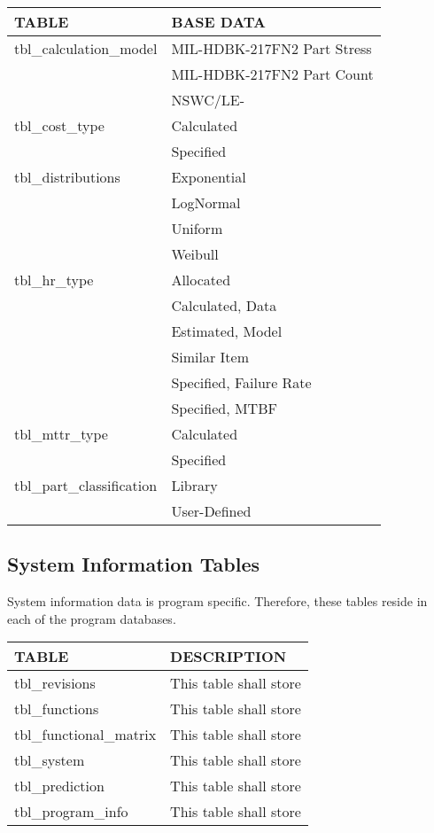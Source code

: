 \documentclass[11pt, 12pt, twoside, onecolumn]{article}
\begin{document}
    \begin{landscape}
    \begin{longtable}{ll}
    TABLE & BASE DATA \\
    \hline
    tbl\_calculation\_model & MIL-HDBK-217FN2 Part Stress \\
    & MIL-HDBK-217FN2 Part Count \\
    & NSWC/LE- \\
    tbl\_cost\_type & Calculated \\
    & Specified \\
    tbl\_distributions & Exponential \\
    & LogNormal \\
    & Uniform \\
    & Weibull \\
    tbl\_hr\_type & Allocated \\
    & Calculated, Data \\
    & Estimated, Model \\
    & Similar Item \\
    & Specified, Failure Rate \\
    & Specified, MTBF \\
    tbl\_mttr\_type & Calculated \\
    & Specified \\
    tbl\_part\_classification & Library \\
    & User-Defined \\
    \hline
    \end{longtable}
    \end{landscape}

\subsection{\bf \large System Information Tables}

\noindent System information data is program specific.  Therefore, these tables reside in each of the program databases. \\

    \begin{landscape}
    \begin{longtable}{ll}
    TABLE & DESCRIPTION \\
    \hline
    tbl\_revisions & This table shall store \\
    tbl\_functions & This table shall store \\
    tbl\_functional\_matrix & This table shall store \\
    tbl\_system & This table shall store \\
    tbl\_prediction & This table shall store \\
    tbl\_program\_info & This table shall store \\
    \hline
    \end{longtable}
    \end{landscape}
\end{document}
